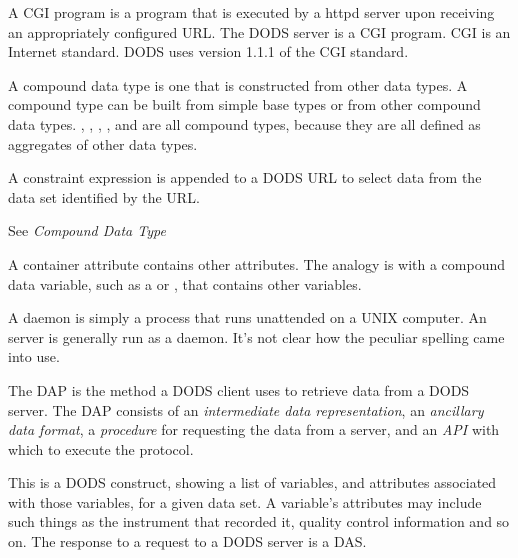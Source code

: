 
A CGI program is a program that is executed by a httpd server upon
receiving an appropriately configured URL. The DODS server is a CGI
program. CGI is an Internet standard.  DODS uses version 1.1.1 of the
CGI standard.


A compound data type is one that is constructed from other data
types. A compound type can be built from simple base types or from
other compound data types. , ,
, , and  are all
compound types, because they are all defined as aggregates of other
data types.


A constraint expression is appended to a DODS URL to select data from
the data set identified by the URL.


See \emph{Compound Data Type}



A container attribute contains other attributes.  The analogy is with
a compound data variable, such as a  or
, that contains other variables.


A daemon is simply a process that runs unattended on a UNIX computer.
An  server is generally run as a daemon. It's not clear how
the peculiar spelling came into use.


The DAP is the method a DODS client uses to retrieve data from a DODS
server.  The DAP consists of an {\em intermediate data
  representation}, an {\em ancillary data format}, a {\em procedure}
for requesting the data from a server, and an {\em API} with which to
execute the protocol.


This is a DODS construct, showing a list of variables, and attributes
associated with those variables, for a given data set. A variable's
attributes may include such things as the instrument that recorded it,
quality control information and so on.  The response to a 
request to a DODS server is a DAS.


